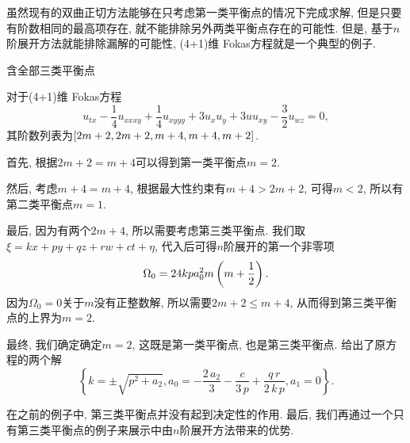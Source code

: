 虽然现有的双曲正切方法能够在只考虑第一类平衡点的情况下完成求解, 但是只要有阶数相同的最高项存在, 就不能排除另外两类平衡点存在的可能性. 但是, 基于$n$阶展开方法就能排除漏解的可能性, (4+1)维 Fokas方程就是一个典型的例子.

\begin{example}含全部三类平衡点

对于(4+1)维 Fokas方程\CITEdaFokas{}
\begin{equation}
    u_{tx}-\frac{1}{4}u_{xxxy}+\frac{1}{4}u_{xyyy}+3u_xu_y+3uu_{xy}-\frac{3}{2}u_{wz}=0 ,
\end{equation}
其阶数列表为$\left[2m+2,2m+2,m+4,m+4,m+2\right]$. 
\begin{compactitem}[\textbullet]
\item 首先, 根据$2m+2=m+4$可以得到第一类平衡点$m=2$.
\item 然后, 考虑$m+4=m+4$, 根据最大性约束有$m+4>2m+2$, 可得$m<2$, 所以有第二类平衡点$m=1$.
\item 最后, 因为有两个$2m+4$, 所以需要考虑第三类平衡点. 我们取$\xi=kx+py+qz+rw+ct+\eta$, 代入后可得$n$阶展开的第一个非零项
\begin{equation}
    \Omega_0 = 24kpa_0^2m\left(m+\frac{1}{2}\right). 
\end{equation}
因为$\Omega_0=0$关于$m$没有正整数解, 所以需要$2m+2\le m+4$, 从而得到第三类平衡点的上界为$m=2$.
\end{compactitem}
   
最终, 我们确定确定$m=2$, 这既是第一类平衡点, 也是第三类平衡点. 给出了原方程的两个解
\begin{equation}
    \left\{ k=\pm \sqrt {{p}^{2}+{{a}_{2}}},{{a}_{0}}=-\frac{2\,{{a}_{2}}}{3}-\frac{c}{3\,p}+ \frac{q\,r}{2\,k\,p},{{a}_{1}}=0\right\} .
\end{equation}
\end{example}

在之前的例子中, 第三类平衡点并没有起到决定性的作用. 最后, 我们再通过一个只有第三类平衡点的例子来展示中由$n$阶展开方法带来的优势.

